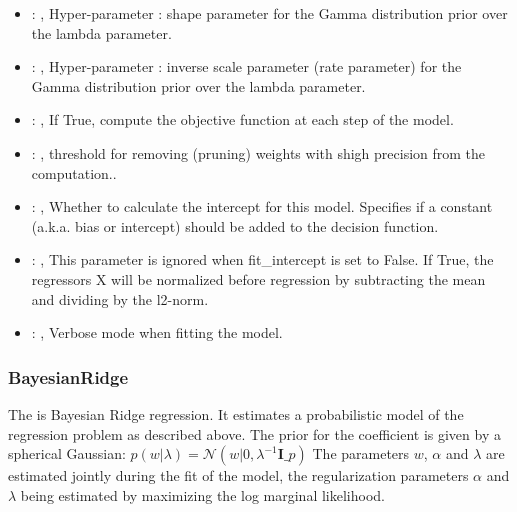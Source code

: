 \begin{itemize}
    \item {}: , 
      Hyper-parameter : shape parameter for the Gamma distribution
      prior over the lambda parameter.

    \item {}: , 
      Hyper-parameter : inverse scale parameter (rate parameter) for
      the Gamma distribution prior over the lambda parameter.

    \item {}: , 
      If True, compute the objective function at each step of the
      model.

    \item {}: , 
      threshold for removing (pruning) weights with
      shigh precision from the computation..

    \item {}: , 
      Whether to calculate the intercept for this model. Specifies if a constant (a.k.a. bias or
      intercept)                                                   should be added to the decision
      function.

    \item {}: , 
      This parameter is ignored when fit\_intercept is set to False. If True,
      the regressors X will be normalized before regression by subtracting the mean and
      dividing by the l2-norm.

    \item {}: , 
      Verbose mode when fitting the model.
  \end{itemize}


\subsubsection{BayesianRidge}
  The  is Bayesian Ridge regression.                         It estimates a
  probabilistic model of the regression problem as                         described above. The
  prior for the coefficient is given by a                         spherical Gaussian:
  $p(w|\lambda) = \mathcal{N}(w|0,\lambda^{-1}\mathbf{I}\_{p})$                         The
  parameters $w$, $\alpha$ and $\lambda$ are estimated jointly during                         the
  fit of the model, the regularization parameters $\alpha$ and $\lambda$
  being estimated by maximizing the log marginal likelihood.


